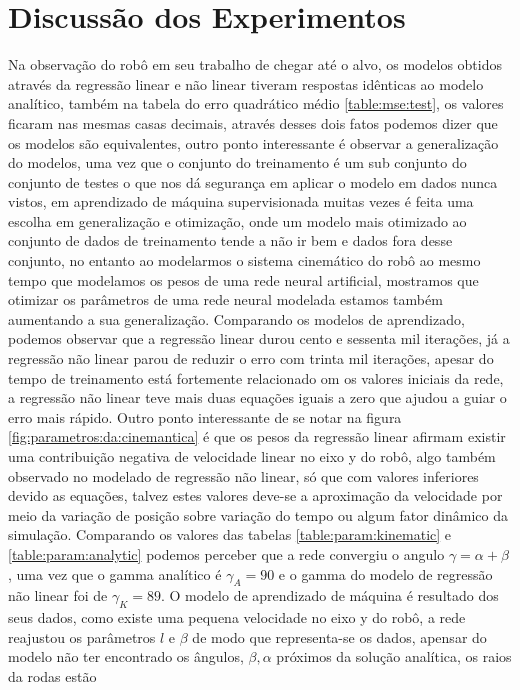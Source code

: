 \section{Discussão dos Experimentos}
Na observação do robô em seu trabalho de chegar até o alvo, os modelos
obtidos através da regressão linear e não linear tiveram respostas
idênticas ao modelo analítico, também na tabela do erro quadrático médio \ref{table:mse:test},
os valores ficaram nas mesmas casas decimais, através desses dois fatos
podemos dizer que os modelos são equivalentes, outro ponto interessante é
observar a generalização do modelos, uma vez que o conjunto do treinamento
é um sub conjunto do conjunto de testes o que nos dá segurança em aplicar
o modelo em dados nunca vistos, em aprendizado de máquina supervisionada
muitas vezes é feita uma escolha em generalização e otimização, onde um
modelo mais otimizado ao conjunto de dados de treinamento tende a não ir
bem e dados fora desse conjunto, no entanto ao modelarmos o sistema cinemático
do robô ao mesmo tempo que modelamos os pesos de uma rede neural artificial,
mostramos que otimizar os parâmetros de uma rede neural modelada estamos
também aumentando a sua generalização.
Comparando os modelos de aprendizado, podemos observar que a regressão
linear durou cento e sessenta mil iterações, já a regressão não linear parou de reduzir
o erro com trinta mil iterações, apesar do tempo de treinamento está
fortemente relacionado om os valores iniciais da rede, a regressão não
linear teve mais duas equações iguais a zero que ajudou a guiar o erro
mais rápido. Outro ponto interessante de se notar na figura \ref{fig:parametros:da:cinemantica}
é que os pesos da regressão linear afirmam existir uma contribuição negativa
de velocidade linear no eixo y do robô, algo também observado no modelado de
regressão não linear, só que com valores inferiores devido as equações,
talvez estes valores deve-se a aproximação da velocidade por meio da variação
de posição sobre variação do tempo ou algum fator dinâmico da simulação.
Comparando os valores das tabelas \ref{table:param:kinematic} e \ref{table:param:analytic}
podemos perceber que a rede convergiu o angulo $\gamma = \alpha + \beta$,
uma vez que o gamma analítico é  $\gamma_{A} = 90$ e o gamma do modelo
de regressão não linear foi de $\gamma_{K} = 89$. O modelo de aprendizado
de máquina é resultado dos seus dados, como existe uma pequena velocidade
no eixo y do robô, a rede reajustou os parâmetros $l$ e $\beta$ de modo que
representa-se os dados, apensar do modelo não ter encontrado os ângulos,
$\beta, \alpha$ próximos da solução analítica, os raios da rodas estão
